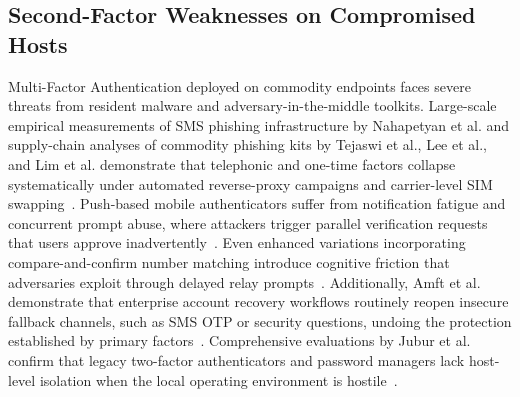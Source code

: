 \begin{table}[!t]
\caption{Synthesis of Prior Cognitive and Browser-Channel Defenses vs. BC-MFA}
\label{tab:related_cognitive}
\centering
{}
\end{table}

\subsection{Second-Factor Weaknesses on Compromised Hosts}
Multi-Factor Authentication deployed on commodity endpoints faces severe threats from resident malware and adversary-in-the-middle toolkits. Large-scale empirical measurements of SMS phishing infrastructure by Nahapetyan et al. and supply-chain analyses of commodity phishing kits by Tejaswi et al., Lee et al., and Lim et al. demonstrate that telephonic and one-time factors collapse systematically under automated reverse-proxy campaigns and carrier-level SIM swapping~\cite{nahapetyan2024sms, tejaswi2022leaky, lee2024beneath, lim2025phishers}. Push-based mobile authenticators suffer from notification fatigue and concurrent prompt abuse, where attackers trigger parallel verification requests that users approve inadvertently~\cite{jubur2021bypassing, mahdad2023breaking}. Even enhanced variations incorporating compare-and-confirm number matching introduce cognitive friction that adversaries exploit through delayed relay prompts~\cite{jubur2025usability}. Additionally, Amft et al. demonstrate that enterprise account recovery workflows routinely reopen insecure fallback channels, such as SMS OTP or security questions, undoing the protection established by primary factors~\cite{amft2023weve}. Comprehensive evaluations by Jubur et al. confirm that legacy two-factor authenticators and password managers lack host-level isolation when the local operating environment is hostile~\cite{jubur2025indepth}.


